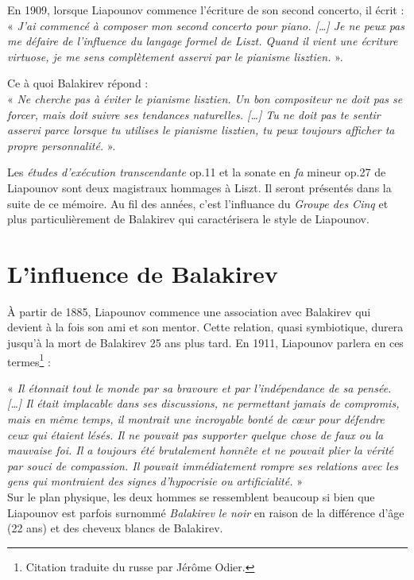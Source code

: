 \indent En 1909, lorsque Liapounov commence l'écriture de son second concerto, il écrit :\\
\indent« \emph{J'ai commencé à composer mon second concerto pour piano. [\dots] Je ne peux pas me défaire de l'influence du langage formel de Liszt. Quand il vient une écriture virtuose, je me sens complètement asservi par le pianisme lisztien.} ».\\

\vspace*{-0.25cm}

\indent Ce à quoi Balakirev répond :\\
\indent« \emph{Ne cherche pas à éviter le pianisme lisztien. Un bon compositeur ne doit pas se forcer, mais doit suivre ses tendances naturelles. [\dots] Tu ne doit pas te sentir asservi parce lorsque tu utilises le pianisme lisztien, tu peux toujours afficher ta propre personnalité.} ».

Les \emph{études d'exécution transcendante} op.11 et la sonate en \emph{fa} mineur op.27 de Liapounov sont deux magistraux hommages à Liszt. Il seront présentés dans la suite de ce mémoire. Au fil des années, c'est l'influance du \emph{Groupe des Cinq} et plus particulièrement de Balakirev qui caractérisera le style de Liapounov.

\section{L'influence de Balakirev}

À partir de 1885, Liapounov commence une association avec Balakirev qui devient à la fois son ami et son mentor. Cette relation, quasi symbiotique, durera jusqu'à la mort de Balakirev 25 ans plus tard. En 1911, Liapounov parlera en ces termes\footnote{Citation traduite du russe par Jérôme Odier.} :

« \emph{Il étonnait tout le monde par sa bravoure et par l'indépendance de sa pensée. [\dots] Il était implacable dans ses discussions, ne permettant jamais de compromis, mais en même temps, il montrait une incroyable bonté de cœur pour défendre ceux qui étaient lésés. Il ne pouvait pas supporter quelque chose de faux ou la mauvaise foi. Il a toujours été brutalement honnête et ne pouvait plier la vérité par souci de compassion. Il pouvait immédiatement rompre ses relations avec les gens qui montraient des signes d'hypocrisie ou artificialité.} »\\

Sur le plan physique, les deux hommes se ressemblent beaucoup si bien que Liapounov est parfois surnommé \emph{Balakirev le noir} en raison de la différence d'âge (22 ans) et des cheveux blancs de Balakirev.

